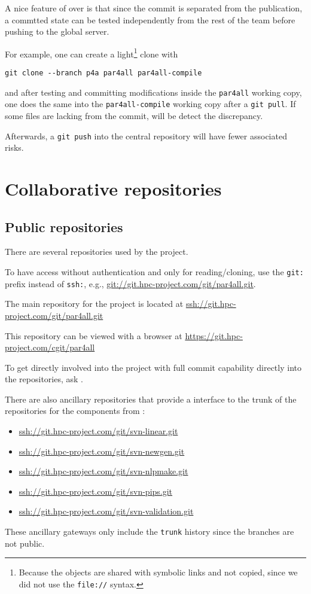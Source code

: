 \documentclass[a4paper]{article}
\begin{document}
A nice feature of \Agit over \Asvn is that since the commit is separated from
the publication, a commtted state can be tested independently from the
rest of the team before pushing to the global server.

For example, one can create a light\footnote{Because the objects are
  shared with symbolic links and not copied, since we did not use the
  \texttt{file://} syntax.} clone with
\begin{verbatim}
git clone --branch p4a par4all par4all-compile
\end{verbatim}
and after testing and committing modifications inside the
\texttt{par4all} working copy, one does the same into the
\texttt{par4all-compile} working copy after a \texttt{git pull}.
If some files are lacking from the commit, \Agit will be detect the discrepancy.

Afterwards, a \texttt{git push} into the central \Apfa
repository will have fewer associated risks.


\section{Collaborative repositories}
\label{sec:coll-repos}


\subsection{Public repositories}
\label{sec:public-repositories}

There are several \Agit repositories used by the project.

To have access without authentication and only for reading/cloning, use
the \texttt{git:} prefix instead of \texttt{ssh:}, e.g.,
\url{git://git.hpc-project.com/git/par4all.git}.

The main repository for the project is located at
\url{ssh://git.hpc-project.com/git/par4all.git}

This repository can be viewed with a \Awww browser at
\url{https://git.hpc-project.com/cgit/par4all}

To get directly involved into the project with full commit capability
directly into the repositories, ask \Ahpcp.

There are also ancillary \Agit repositories that provide a \Agit interface to
the trunk of the \Asvn repositories for the \Apips components from
\Acri:
\begin{itemize}
\item \url{ssh://git.hpc-project.com/git/svn-linear.git}
\item \url{ssh://git.hpc-project.com/git/svn-newgen.git}
\item \url{ssh://git.hpc-project.com/git/svn-nlpmake.git}
\item \url{ssh://git.hpc-project.com/git/svn-pips.git}
\item \url{ssh://git.hpc-project.com/git/svn-validation.git}
\end{itemize}
These ancillary gateways only include the \texttt{trunk} history since the
\Acri branches are not public.
\end{document}
